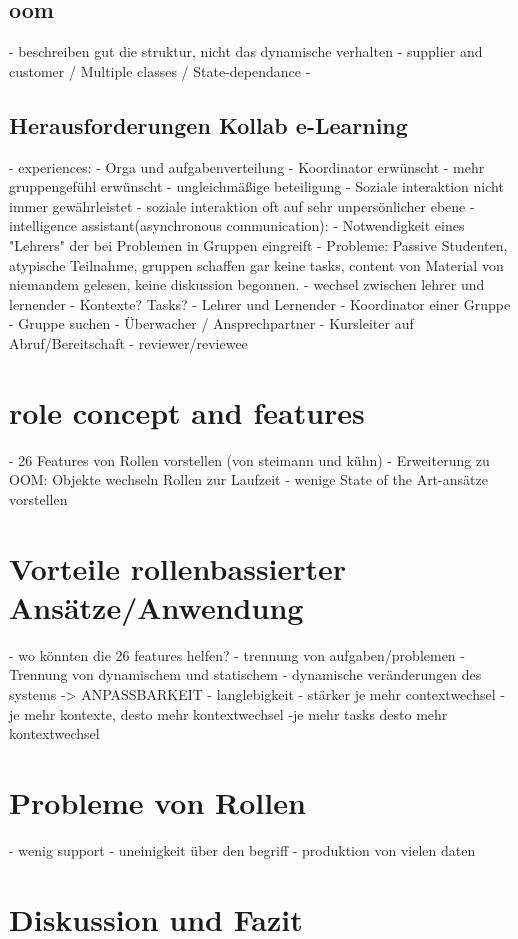 \documentclass[conference]{IEEEtran}
\begin{document}
{\subsection{oom}
- beschreiben gut die struktur, nicht das dynamische verhalten
- supplier and customer / Multiple classes / State-dependance
- 
\subsection{Herausforderungen Kollab e-Learning}
- experiences: 
	- Orga und aufgabenverteilung
	- Koordinator erwünscht
	- mehr gruppengefühl erwünscht
	- ungleichmäßige beteiligung
- Soziale interaktion nicht immer gewährleistet
	- soziale interaktion oft auf sehr unpersönlicher ebene
- intelligence assistant(asynchronous communication):
	- Notwendigkeit eines "Lehrers" der bei Problemen in Gruppen eingreift
		- Probleme: Passive Studenten, atypische Teilnahme, gruppen schaffen gar keine tasks, content von Material von niemandem gelesen, keine diskussion begonnen.
- wechsel zwischen lehrer und lernender
- Kontexte? Tasks?  
	- Lehrer und Lernender
	- Koordinator einer Gruppe
	- Gruppe suchen
	- Überwacher / Ansprechpartner
	- Kursleiter auf Abruf/Bereitschaft
	- reviewer/reviewee


\section{role concept and features}
- 26 Features von Rollen vorstellen (von steimann und kühn)
- Erweiterung zu OOM: Objekte wechseln Rollen zur Laufzeit
- wenige State of the Art-ansätze vorstellen


\section{Vorteile rollenbassierter Ansätze/Anwendung}
- wo könnten die 26 features helfen? 
- trennung von aufgaben/problemen
- Trennung von dynamischem und statischem
- dynamische veränderungen des systems -> ANPASSBARKEIT
- langlebigkeit
- stärker je mehr contextwechsel
	-je mehr kontexte, desto mehr kontextwechsel
		-je mehr tasks desto mehr kontextwechsel

\section{Probleme von Rollen}
- wenig support
- uneinigkeit über den begriff 
- produktion von vielen daten


\section{Diskussion und Fazit}




}
\end{document}
